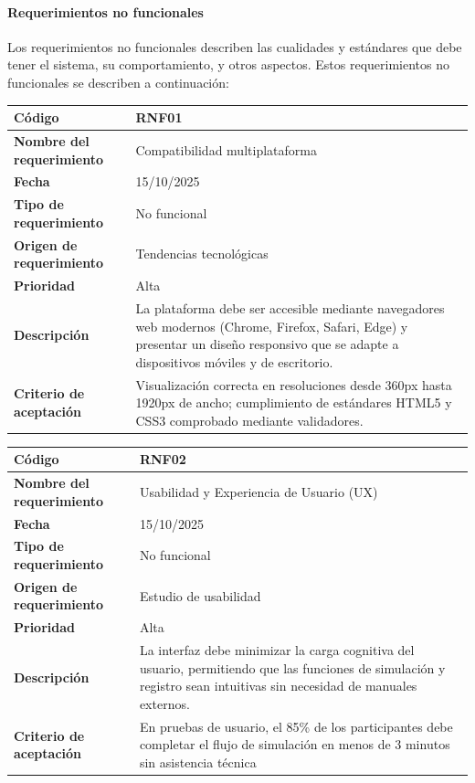\paragraph*{Requerimientos no funcionales}
Los requerimientos no funcionales describen las cualidades y estándares que debe tener el sistema, su comportamiento, y otros aspectos. Estos requerimientos no funcionales se describen a continuación:

\begin{table}[H]
	\begin{tabular}{|s{5cm}|m{11cm}|}
		\hline
		\textbf{Código} & RNF01 \\ \hline
		\textbf{Nombre del requerimiento} & Compatibilidad multiplataforma \\ \hline
		\textbf{Fecha} & 15/10/2025 \\ \hline
		\textbf{Tipo de requerimiento} & No funcional \\ \hline
		\textbf{Origen de requerimiento} & Tendencias tecnológicas \\ \hline
		\textbf{Prioridad} & Alta \\ \hline
		\textbf{Descripción} & La plataforma debe ser accesible mediante navegadores web modernos (Chrome, Firefox, Safari, Edge) y presentar un diseño responsivo que se adapte a dispositivos móviles y de escritorio. \\ \hline
		\textbf{Criterio de aceptación} & Visualización correcta en resoluciones desde 360px hasta 1920px de ancho; cumplimiento de estándares HTML5 y CSS3 comprobado mediante validadores. \\ \hline
	\end{tabular}
\end{table}

\begin{table}[H]
	\begin{tabular}{|s{5cm}|m{11cm}|}
		\hline
		\textbf{Código} & RNF02 \\ \hline
		\textbf{Nombre del requerimiento} & Usabilidad y Experiencia de Usuario (UX) \\ \hline
		\textbf{Fecha} & 15/10/2025 \\ \hline
		\textbf{Tipo de requerimiento} & No funcional \\ \hline
		\textbf{Origen de requerimiento} & Estudio de usabilidad \\ \hline
		\textbf{Prioridad} & Alta \\ \hline
		\textbf{Descripción} & La interfaz debe minimizar la carga cognitiva del usuario, permitiendo que las funciones de simulación y registro sean intuitivas sin necesidad de manuales externos. \\ \hline
		\textbf{Criterio de aceptación} & En pruebas de usuario, el 85\% de los participantes debe completar el flujo de simulación en menos de 3 minutos sin asistencia técnica \\ \hline
	\end{tabular}
\end{table}

